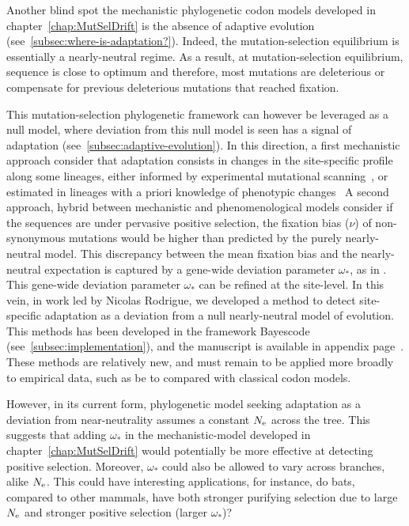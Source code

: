 Another blind spot the mechanistic phylogenetic codon models developed in chapter~\ref{chap:MutSelDrift} is the absence of adaptive evolution (see~\ref{subsec:where-is-adaptation?}).
Indeed, the mutation-selection equilibrium is essentially a nearly-neutral regime.
As a result, at mutation-selection equilibrium, sequence is close to optimum and therefore, most mutations are deleterious or compensate for previous deleterious mutations that reached fixation.

This mutation-selection phylogenetic framework can however be leveraged as a null model, where deviation from this null model is seen has a signal of adaptation (see~\ref{subsec:adaptive-evolution}).
In this direction, a first mechanistic approach consider that adaptation consists in changes in the site-specific profile along some lineages, either informed by experimental mutational scanning~\citep{Bloom2017}, or estimated in lineages with a priori knowledge of phenotypic changes~\citep{Parto2018}
A second approach, hybrid between mechanistic and phenomenological models consider if the sequences are under pervasive positive selection, the fixation bias ($\nu$) of non-synonymous mutations would be higher than predicted by the purely nearly-neutral model.
This discrepancy between the mean fixation bias and the nearly-neutral expectation is captured by a gene-wide deviation parameter $\omega_*$, as in \citet{Rodrigue2016}.
This gene-wide deviation parameter $\omega_*$ can be refined at the site-level.
In this vein, in work led by Nicolas Rodrigue, we developed a method to detect site-specific adaptation as a deviation from a null nearly-neutral model of evolution.
This methods has been developed in the framework Bayescode (see~\ref{subsec:implementation}), and the manuscript is available in appendix page~\pageref{sec-appendix:MutSelM3starMBE}.
These methods are relatively new, and must remain to be applied more broadly to empirical data, such as be to compared with classical codon models.

However, in its current form, phylogenetic model seeking adaptation as a deviation from near-neutrality assumes a constant $N_{\textrm{e}}$ across the tree.
This suggests that adding $\omega_*$ in the mechanistic-model developed in chapter~\ref{chap:MutSelDrift} would potentially be more effective at detecting positive selection.
Moreover, $\omega_*$ could also be allowed to vary across branches, alike $N_{\textrm{e}}$.
This could have interesting applications, for instance, do bats, compared to other mammals, have both stronger purifying selection due to large $N_{\textrm{e}}$ and stronger positive selection (larger $\omega_*$)?

